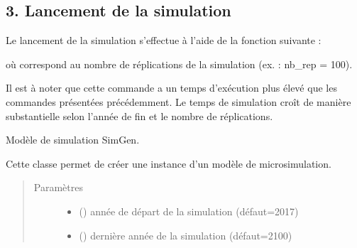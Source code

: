 \documentclass[letterpaper,10pt,french]{sphinxmanual}
\begin{document}
\begin{DUlineblock}{0em}
\item[] 
\end{DUlineblock}


\subsection{3. Lancement de la simulation}
\label{\detokenize{utilisation:lancement-de-la-simulation}}
Le lancement de la simulation s’effectue à l’aide de la fonction suivante :

\begin{sphinxVerbatim}[commandchars=\\\{\}]
\end{sphinxVerbatim}

où  correspond au nombre de réplications de la simulation (ex. : nb\_rep = 100).

Il est à noter que cette commande a un temps d’exécution plus élevé que les commandes présentées précédemment.
Le temps de simulation croît de manière substantielle selon l’année de fin et le nombre de réplications.


\begin{fulllineitems}
Modèle de simulation SimGen.

Cette classe permet de créer une instance d’un modèle de microsimulation.
\begin{quote}\begin{description}
\item[{Paramètres}] \leavevmode\begin{itemize}
\item {} 
 () \textendash{} année de départ de la simulation (défaut=2017)

\item {} 
 () \textendash{} dernière année de la simulation (défaut=2100)

\end{itemize}

\end{description}\end{quote}

\end{fulllineitems}
\end{document}
